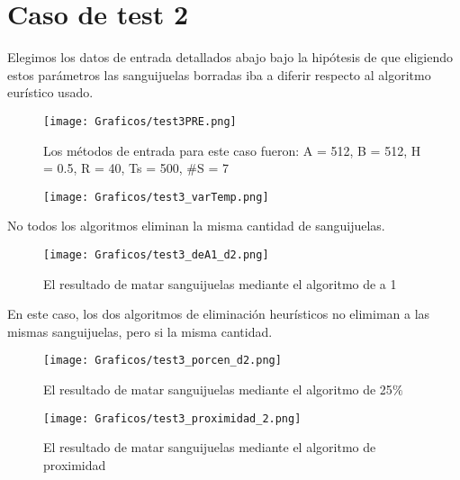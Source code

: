 \documentclass[double, 1.5in, 12pt]{beavtex}
\begin{document}
\section{Caso de test 2}
Elegimos los datos de entrada detallados abajo bajo la hip\'otesis de que eligiendo estos par\'ametros las sanguijuelas borradas iba a diferir respecto al algoritmo eur\'istico usado.
\begin{figure}[H]
\begin{center}
	\texttt{[image: Graficos/test3PRE.png]}
	\caption{Los m\'etodos de entrada para este caso fueron:
A = 512, 
B = 512, 
H = 0.5, 
R = 40, 
Ts = 500, 
$\#$S = 7}
	\label{fig:frog}
	\end{center}
\end{figure}

\begin{figure}[H]
\begin{center}
	\texttt{[image: Graficos/test3\_varTemp.png]}
	\label{fig:frog}
	\end{center}
\end{figure}
No todos los algoritmos eliminan la misma cantidad de sanguijuelas.
\begin{figure}[H]
\begin{center}
	\texttt{[image: Graficos/test3\_deA1\_d2.png]}
	\caption{El resultado de matar sanguijuelas mediante el algoritmo de a 1}
	\label{fig:frog}
	\end{center}
\end{figure}


En este caso, los dos algoritmos de eliminaci\'on heur\'isticos no elimiman a las mismas sanguijuelas, pero si la misma cantidad.

\begin{figure}[H]
\begin{center}
	\texttt{[image: Graficos/test3\_porcen\_d2.png]}
	\caption{El resultado de matar sanguijuelas mediante el algoritmo de 25$\%$}
	\label{fig:frog}
	\end{center}
\end{figure}

\begin{figure}[H]
\begin{center}
	\texttt{[image: Graficos/test3\_proximidad\_2.png]}
	\caption{El resultado de matar sanguijuelas mediante el algoritmo de proximidad}
	\label{fig:frog}
	\end{center}
\end{figure}
\end{document}
